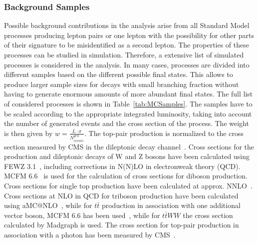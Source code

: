 \subsubsection{Background Samples}
Possible background contributions in the analysis arise from all Standard Model processes producing lepton pairs or one lepton with the possibility for other parts of their signature to be misidentified as a second lepton. The properties of these processes can be studied in simulation. Therefore, a extensive list of simulated processes is considered in the analysis. In many cases, processes are divided into different samples based on the different possible final states. This allows to produce larger sample sizes for decays with small branching fraction without having to generate enormous amounts of more abundant final states. The full list of considered processes is shown in Table~\ref{tab:MCSamples}. The samples have to be scaled according to the appropriate integrated luminosity, taking into account the number of generated events and the cross section of the process. The weight is then given by $w  = \frac{L\cdot \sigma}{N_{events}^{gen}}$. The top-pair production is normalized to the cross section measured by CMS in the dileptonic decay channel~\cite{ttXsec}. Cross sections for the production and dileptonic decays of W and Z bosons have been calculated using FEWZ 3.1~\cite{Li:2012wna}, including corrections in N(N)LO in electronweak theory (QCD). MCFM 6.6~\cite{Campbell:2011bn} is used for the calculation of cross sections for diboson production. Cross sections for single top production have been calculated at approx. NNLO~\cite{Kidonakis:2012db}. Cross sections at NLO in QCD for triboson production have been calculated using aMC@NLO~\cite{Madgraph2}, while for $t\bar{t}$ production in association with one additional vector boson, MCFM 6.6 has been used~\cite{Garzelli:2012bn}, while for  $t\bar{t}WW$ the cross section calculated by Madgraph is used. The cross section for top-pair production in association with a photon has been measured by CMS~\cite{CMS-PAS-TOP-13-011}.  

